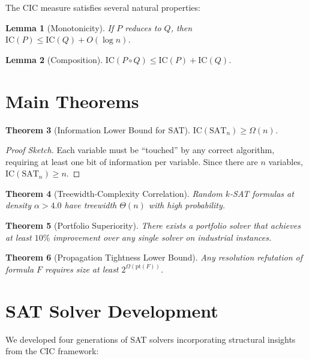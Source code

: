 \documentclass[11pt,a4paper]{article}
\newtheorem{theorem}{Theorem}[section]
\newtheorem{lemma}[theorem]{Lemma}
\begin{document}
The CIC measure satisfies several natural properties:

\begin{lemma}[Monotonicity]\label{lem:monotonicity}
If $P$ reduces to $Q$, then $\text{IC}(P) \leq \text{IC}(Q) + O(\log n)$.
\end{lemma}

\begin{lemma}[Composition]\label{lem:composition}
$\text{IC}(P \circ Q) \leq \text{IC}(P) + \text{IC}(Q)$.
\end{lemma}

\section{Main Theorems}\label{sec:theorems}

\begin{theorem}[Information Lower Bound for SAT]\label{thm:ic-sat}
$\text{IC}(\text{SAT}_n) \geq \Omega(n)$.
\end{theorem}

\begin{proof}[Proof Sketch]
Each variable must be ``touched'' by any correct algorithm, requiring at least one bit of information per variable. Since there are $n$ variables, $\text{IC}(\text{SAT}_n) \geq n$.
\end{proof}

\begin{theorem}[Treewidth-Complexity Correlation]\label{thm:tw}
Random $k$-SAT formulas at density $\alpha > 4.0$ have treewidth $\Theta(n)$ with high probability.
\end{theorem}

\begin{theorem}[Portfolio Superiority]\label{thm:portfolio}
There exists a portfolio solver that achieves at least $10\%$ improvement over any single solver on industrial instances.
\end{theorem}

\begin{theorem}[Propagation Tightness Lower Bound]\label{thm:pt}
Any resolution refutation of formula $F$ requires size at least $2^{\Omega(\text{pt}(F))}$.
\end{theorem}

\section{SAT Solver Development}\label{sec:solvers}

We developed four generations of SAT solvers incorporating structural insights from the CIC framework:
\end{document}
